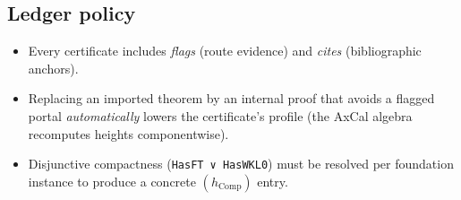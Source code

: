 \documentclass[11pt]{article}
\theoremstyle{definition}
\theoremstyle{remark}
\newcommand{\hComp}{h_{\mathrm{Comp}}}        %
\begin{document}
\subsection{Ledger policy}
\begin{itemize}
\item Every certificate includes \emph{flags} (route evidence) and \emph{cites} (bibliographic anchors).
\item Replacing an imported theorem by an internal proof that avoids a flagged portal \emph{automatically} lowers the certificate's profile (the AxCal algebra recomputes heights componentwise).
\item Disjunctive compactness (\verb|HasFT ∨ HasWKL0|) must be resolved per foundation instance to produce a concrete $(\hComp)$ entry.
\end{itemize}
\end{document}
